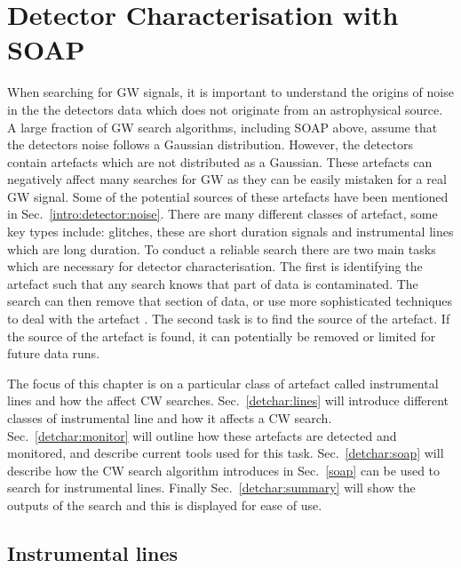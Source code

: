 \chapter{\label{detchar}Detector Characterisation with SOAP}

When searching for \ac{GW} signals, it is important to understand the origins of noise in the the detectors data which does not originate from an astrophysical source.
A large fraction of \ac{GW} search algorithms, including SOAP above, assume that the detectors noise follows a Gaussian distribution.
However, the detectors contain artefacts which are not distributed as a Gaussian. 
These artefacts can negatively affect many searches for \ac{GW} as they can be easily mistaken for a real \ac{GW} signal.
Some of the potential sources of these artefacts have been mentioned in Sec.~\ref{intro:detector:noise}. 
There are many different classes of artefact, some key types include: glitches, these are short duration signals and instrumental lines which are long duration.
To conduct a reliable search there are two main tasks which are necessary for detector characterisation.
The first is identifying the artefact such that any search knows that part of data is contaminated.
The search can then remove that section of data, or use more sophisticated techniques to deal with the artefact \citep{}.
The second task is to find the source of the artefact. 
If the source of the artefact is found, it can potentially be removed or limited for future data runs.

The focus of this chapter is on a particular class of artefact called instrumental lines and how the affect \ac{CW} searches.
Sec.~\ref{detchar:lines} will introduce different classes of instrumental line and how it affects a \ac{CW} search.
Sec.~\ref{detchar:monitor} will outline how these artefacts are detected and monitored, and describe current tools used for this task.
Sec.~\ref{detchar:soap} will describe how the \ac{CW} search algorithm introduces in Sec.~\ref{soap} can be used to search for instrumental lines.
Finally Sec.~\ref{detchar:summary} will show the outputs of the search and this is displayed for ease of use.



\section{\label{detchar:lines}Instrumental lines}

